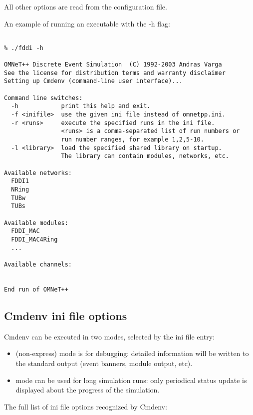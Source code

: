 All other options are read from the configuration file.

An example of running an {\opp} executable with the -h flag:

\begin{verbatim}

% ./fddi -h

OMNeT++ Discrete Event Simulation  (C) 1992-2003 Andras Varga
See the license for distribution terms and warranty disclaimer
Setting up Cmdenv (command-line user interface)...

Command line switches:
  -h            print this help and exit.
  -f <inifile>  use the given ini file instead of omnetpp.ini.
  -r <runs>     execute the specified runs in the ini file.
                <runs> is a comma-separated list of run numbers or
                run number ranges, for example 1,2,5-10.
  -l <library>  load the specified shared library on startup.
                The library can contain modules, networks, etc.

Available networks:
  FDDI1
  NRing
  TUBw
  TUBs

Available modules:
  FDDI_MAC
  FDDI_MAC4Ring
  ...

Available channels:


End run of OMNeT++
\end{verbatim}


\subsection{Cmdenv ini file options}
\label{sec:ch-run-sim:cmdenv-section}

Cmdenv can be executed in two modes, selected by the  ini file entry:

\begin{itemize}
    \item {} (non-express) mode is for debugging: detailed information
        will be written to the standard output (event banners, module output,
        etc).
    \item {} mode can be used for long simulation runs: only
        periodical status update is displayed about the progress of the
        simulation.
\end{itemize}

The full list of ini file options recognized by Cmdenv:

